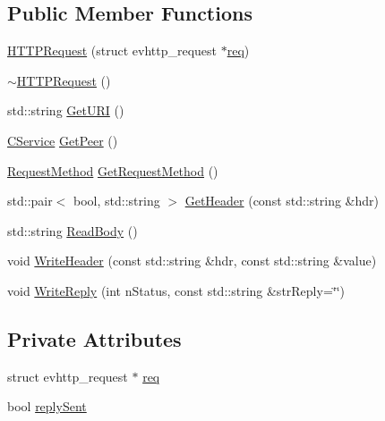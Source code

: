 \subsection*{Public Member Functions}
\begin{DoxyCompactItemize}
\item 
\mbox{\hyperlink{class_h_t_t_p_request_aab94919073c53e2302a653cb0c91a7d5}{H\+T\+T\+P\+Request}} (struct evhttp\+\_\+request $\ast$\mbox{\hyperlink{class_h_t_t_p_request_aa8b4243a4a15afaa00b3b47947fcfea3}{req}})
\item 
\mbox{\hyperlink{class_h_t_t_p_request_ab5864e916f43eddde9d2ccb69e0f1385}{$\sim$\+H\+T\+T\+P\+Request}} ()
\item 
std\+::string \mbox{\hyperlink{class_h_t_t_p_request_a53a138e588e5326d6c87bb84029f43e9}{Get\+U\+RI}} ()
\item 
\mbox{\hyperlink{class_c_service}{C\+Service}} \mbox{\hyperlink{class_h_t_t_p_request_a73ba24bc6528fd1aa5024c10330bfdfb}{Get\+Peer}} ()
\item 
\mbox{\hyperlink{class_h_t_t_p_request_a1afe92e9caad997b8f88f0cb07dcc5aa}{Request\+Method}} \mbox{\hyperlink{class_h_t_t_p_request_afc79079a153c70240914617a9dde075d}{Get\+Request\+Method}} ()
\item 
std\+::pair$<$ bool, std\+::string $>$ \mbox{\hyperlink{class_h_t_t_p_request_a7d31adee3f9e93edea6d9a5bd4454aae}{Get\+Header}} (const std\+::string \&hdr)
\item 
std\+::string \mbox{\hyperlink{class_h_t_t_p_request_ad0dc256f16fe6d13022958d64b7a22a0}{Read\+Body}} ()
\item 
void \mbox{\hyperlink{class_h_t_t_p_request_a910ea3b361715e036dc74eb75e92fb62}{Write\+Header}} (const std\+::string \&hdr, const std\+::string \&value)
\item 
void \mbox{\hyperlink{class_h_t_t_p_request_a43767ec5daf58e5a13a740ed56ddca3f}{Write\+Reply}} (int n\+Status, const std\+::string \&str\+Reply=\char`\"{}\char`\"{})
\end{DoxyCompactItemize}
\subsection*{Private Attributes}
\begin{DoxyCompactItemize}
\item 
struct evhttp\+\_\+request $\ast$ \mbox{\hyperlink{class_h_t_t_p_request_aa8b4243a4a15afaa00b3b47947fcfea3}{req}}
\item 
bool \mbox{\hyperlink{class_h_t_t_p_request_a1267b5e169b279bdbce5ea9c90f04483}{reply\+Sent}}
\end{DoxyCompactItemize}



